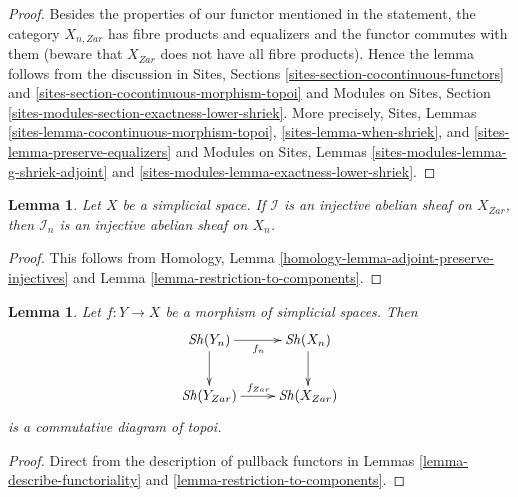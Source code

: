\documentclass{stacks-project}
\theoremstyle{plain}
\newtheorem{lemma}[subsection]{Lemma}
\theoremstyle{definition}
\theoremstyle{remark}
\numberwithin{equation}{subsection}
\def\Sh{\mathop{\mathit{Sh}}\nolimits}
\begin{document}
\begin{proof}
Besides the properties of our functor mentioned in the statement,
the category $X_{n, Zar}$ has fibre products and equalizers
and the functor commutes with them (beware that $X_{Zar}$ does not
have all fibre products). Hence the lemma follows from the discussion in
Sites, Sections \ref{sites-section-cocontinuous-functors} and
\ref{sites-section-cocontinuous-morphism-topoi}
and
Modules on Sites, Section \ref{sites-modules-section-exactness-lower-shriek}.
More precisely,
Sites, Lemmas \ref{sites-lemma-cocontinuous-morphism-topoi},
\ref{sites-lemma-when-shriek}, and
\ref{sites-lemma-preserve-equalizers}
and
Modules on Sites, Lemmas
\ref{sites-modules-lemma-g-shriek-adjoint} and
\ref{sites-modules-lemma-exactness-lower-shriek}.
\end{proof}

\begin{lemma}
\label{lemma-restriction-injective-to-component}
Let $X$ be a simplicial space. If $\mathcal{I}$ is an injective abelian
sheaf on $X_{Zar}$, then $\mathcal{I}_n$ is an injective abelian sheaf
on $X_n$.
\end{lemma}

\begin{proof}
This follows from
Homology, Lemma \ref{homology-lemma-adjoint-preserve-injectives}
and
Lemma \ref{lemma-restriction-to-components}.
\end{proof}

\begin{lemma}
\label{lemma-restriction-to-components-functorial}
Let $f : Y \to X$ be a morphism of simplicial spaces. Then
$$
\xymatrix{
\Sh(Y_n) \ar[d] \ar[r]_{f_n} & \Sh(X_n) \ar[d] \\
\Sh(Y_{Zar}) \ar[r]^{f_{Zar}} & \Sh(X_{Zar})
}
$$
is a commutative diagram of topoi.
\end{lemma}

\begin{proof}
Direct from the description of pullback functors in
Lemmas \ref{lemma-describe-functoriality} and
\ref{lemma-restriction-to-components}.
\end{proof}
\end{document}
